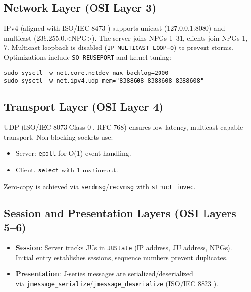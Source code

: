\documentclass{article}
\begin{document}
\subsection{Network Layer (OSI Layer 3)}
IPv4 (aligned with ISO/IEC 8473 \cite{iso8473}) supports unicast (127.0.0.1:8080) and multicast (239.255.0.<NPG>). The server joins NPGs 1--31, clients join NPGs 1, 7. Multicast loopback is disabled (\texttt{IP\_MULTICAST\_LOOP=0}) to prevent storms. Optimizations include \texttt{SO\_REUSEPORT} and kernel tuning:
\begin{lstlisting}[caption={Kernel Tuning Commands}]
sudo sysctl -w net.core.netdev_max_backlog=2000
sudo sysctl -w net.ipv4.udp_mem="8388608 8388608 8388608"
\end{lstlisting}

\subsection{Transport Layer (OSI Layer 4)}
UDP (ISO/IEC 8073 Class 0 \cite{iso8073}, RFC 768) ensures low-latency, multicast-capable transport. Non-blocking sockets use:
\begin{itemize}
    \item Server: \texttt{epoll} for O(1) event handling.
    \item Client: \texttt{select} with 1 ms timeout.
\end{itemize}
Zero-copy is achieved via \texttt{sendmsg}/\texttt{recvmsg} with \texttt{struct iovec}.

\subsection{Session and Presentation Layers (OSI Layers 5--6)}
\begin{itemize}
    \item \textbf{Session}: Server tracks JUs in \texttt{JUState} (IP address, JU address, NPGs). Initial entry establishes sessions, sequence numbers prevent duplicates.
    \item \textbf{Presentation}: J-series messages are serialized/deserialized \\ via \texttt{jmessage\_serialize}/\texttt{jmessage\_deserialize} (ISO/IEC 8823 \cite{iso8823}).
\end{itemize}
\end{document}
